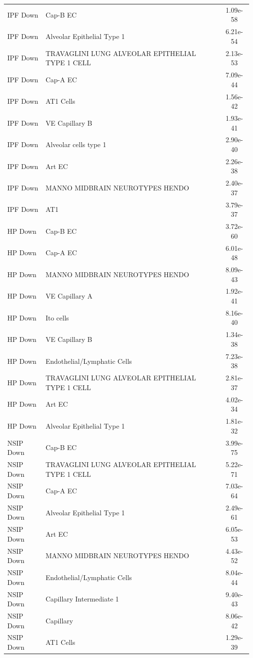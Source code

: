 \documentclass[
]{article}
\begin{document}
\begin{singlespace}
\begin{longtable}[t]{>{\raggedright\arraybackslash}p{0.8in}>{\raggedright\arraybackslash}p{4.5in}c}
\endfoot
\bottomrule
\endlastfoot
IPF Down & Cap-B EC & 1.09e-58\\
IPF Down & Alveolar Epithelial Type 1 & 6.21e-54\\
IPF Down & TRAVAGLINI LUNG ALVEOLAR EPITHELIAL TYPE 1 CELL & 2.13e-53\\
IPF Down & Cap-A EC & 7.09e-44\\
IPF Down & AT1 Cells & 1.56e-42\\
\addlinespace
IPF Down & VE Capillary B & 1.93e-41\\
IPF Down & Alveolar cells type 1 & 2.90e-40\\
IPF Down & Art EC & 2.26e-38\\
IPF Down & MANNO MIDBRAIN NEUROTYPES HENDO & 2.40e-37\\
IPF Down & AT1 & 3.79e-37\\
\addlinespace
HP Down & Cap-B EC & 3.72e-60\\
HP Down & Cap-A EC & 6.01e-48\\
HP Down & MANNO MIDBRAIN NEUROTYPES HENDO & 8.09e-43\\
HP Down & VE Capillary A & 1.92e-41\\
HP Down & Ito cells & 8.16e-40\\
\addlinespace
HP Down & VE Capillary B & 1.34e-38\\
HP Down & Endothelial/Lymphatic Cells & 7.23e-38\\
HP Down & TRAVAGLINI LUNG ALVEOLAR EPITHELIAL TYPE 1 CELL & 2.81e-37\\
HP Down & Art EC & 4.02e-34\\
HP Down & Alveolar Epithelial Type 1 & 1.81e-32\\
\addlinespace
NSIP Down & Cap-B EC & 3.99e-75\\
NSIP Down & TRAVAGLINI LUNG ALVEOLAR EPITHELIAL TYPE 1 CELL & 5.22e-71\\
NSIP Down & Cap-A EC & 7.03e-64\\
NSIP Down & Alveolar Epithelial Type 1 & 2.49e-61\\
NSIP Down & Art EC & 6.05e-53\\
\addlinespace
NSIP Down & MANNO MIDBRAIN NEUROTYPES HENDO & 4.43e-52\\
NSIP Down & Endothelial/Lymphatic Cells & 8.04e-44\\
NSIP Down & Capillary Intermediate 1 & 9.40e-43\\
NSIP Down & Capillary & 8.06e-42\\
NSIP Down & AT1 Cells & 1.29e-39\\

\end{longtable}
\end{singlespace}
\end{document}
